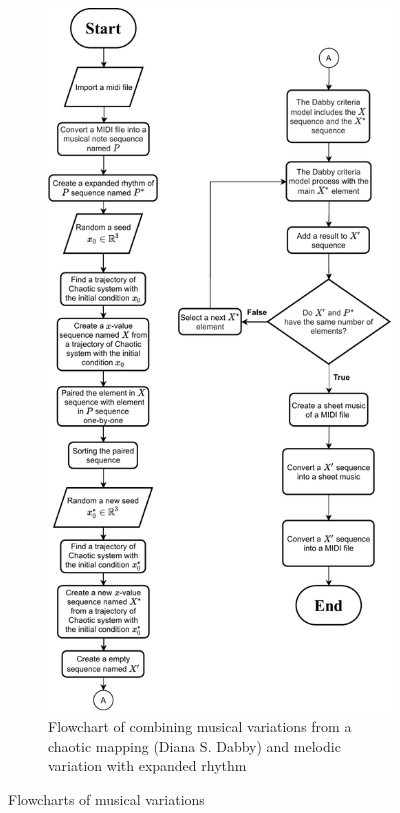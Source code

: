 \documentclass[11pt]{article}
\theoremstyle{definition}
\begin{document}
\begin{figure}
\begin{subfigure}{0.45\textwidth}
\end{subfigure}
\begin{subfigure}{0.45\textwidth}
  \centering
  \includegraphics[scale=0.55]{Real_process.pdf}
  \caption{Flowchart of combining musical variations from a chaotic mapping (Diana S. Dabby) and melodic variation with expanded rhythm}
\end{subfigure}
\caption{Flowcharts of musical variations}
\label{fig:combined_flowcharts}
\end{figure}
\fi

\printbibliography
\end{document}
